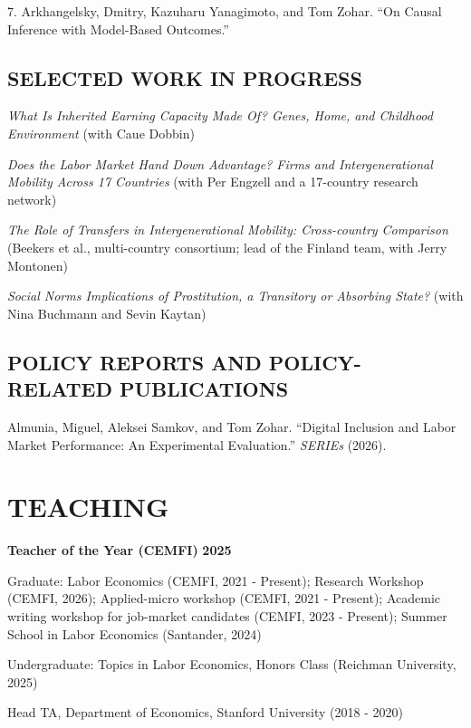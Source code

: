 \documentclass[margin]{res} %
\begin{document}
\begin{resume}
7. Arkhangelsky, Dmitry, Kazuharu Yanagimoto, and Tom Zohar. ``On Causal Inference with Model-Based Outcomes.''

\subsection{SELECTED WORK IN PROGRESS}

\textit{What Is Inherited Earning Capacity Made Of? Genes, Home, and Childhood Environment} (with Caue Dobbin)

\textit{Does the Labor Market Hand Down Advantage? Firms and Intergenerational Mobility Across 17 Countries} (with Per Engzell and a 17-country research network)

\textit{The Role of Transfers in Intergenerational Mobility: Cross-country Comparison} (Beekers et al., multi-country consortium; lead of the Finland team, with Jerry Montonen)

\textit{Social Norms Implications of Prostitution, a Transitory or Absorbing State?} (with Nina Buchmann and Sevin Kaytan)

\subsection{POLICY REPORTS AND POLICY-RELATED PUBLICATIONS}

Almunia, Miguel, Aleksei Samkov, and Tom Zohar. ``Digital Inclusion and Labor Market Performance: An Experimental Evaluation.'' \textit{SERIEs} (2026).


\section{TEACHING}

\textbf{Teacher of the Year (CEMFI)} \hfill \textbf{2025}

Graduate: Labor Economics (CEMFI, 2021 - Present); Research Workshop (CEMFI, 2026); Applied-micro workshop (CEMFI, 2021 - Present); Academic writing workshop for job-market candidates (CEMFI, 2023 - Present); Summer School in Labor Economics (Santander, 2024)

Undergraduate: Topics in Labor Economics, Honors Class (Reichman University, 2025)

Head TA, Department of Economics, Stanford University (2018 - 2020)


\end{resume}
\end{document}
